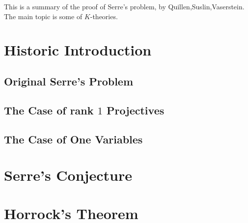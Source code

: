 \documentclass[Total.tex]{subfiles}
\begin{document}
	This is a summary of the proof of Serre's problem, by Quillen,Suslin,Vaserstein. The main topic is some of $K$-theories.
	
	\chapter{Historic Introduction}
		\section{Original Serre's Problem}
		\section{The Case of rank $1$ Projectives}
		\section{The Case of One Variables}
	\chapter{Serre's Conjecture}
	\chapter{Horrock's Theorem}
\end{document}
